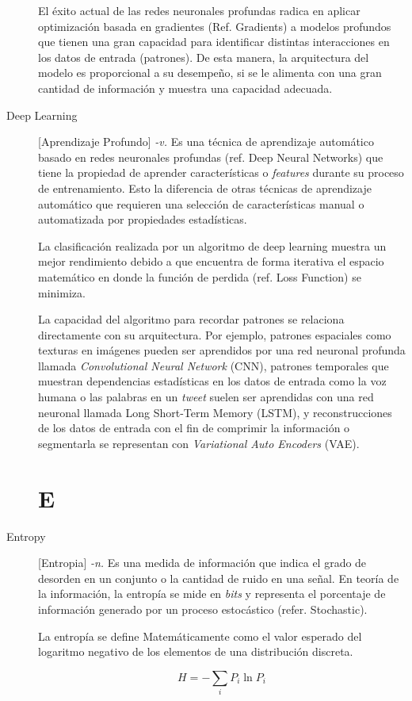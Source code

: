 \documentclass[twoside]{book}
\newcommand{\ditem}[1]{\item[#1] \markboth{\footnotesize \textbf{#1}}{\footnotesize \textbf{#1}}}
\begin{document}
\begin{multicols}{2}
\begin{description}
El éxito actual de las redes neuronales profundas radica en aplicar optimización basada en gradientes (Ref. Gradients) a modelos profundos que tienen una gran capacidad para identificar distintas interacciones en los datos de entrada (patrones). De esta manera, la arquitectura del modelo es proporcional a su desempeño, si se le alimenta con una gran cantidad de información y muestra una capacidad adecuada.
\ditem{Deep Learning} [Aprendizaje Profundo] \textit{-v.} Es una técnica de aprendizaje automático basado en redes neuronales profundas (ref. Deep Neural Networks) que tiene la propiedad de aprender características o \textit{features} durante su proceso de entrenamiento. Esto la diferencia de otras técnicas de aprendizaje automático que requieren una selección de características manual o automatizada por propiedades estadísticas. 

La clasificación realizada por un algoritmo de deep learning muestra un mejor rendimiento debido a que encuentra de forma iterativa el espacio matemático en donde la función de perdida (ref. Loss Function) se minimiza. 

La capacidad del algoritmo para recordar patrones se relaciona directamente con su arquitectura. Por ejemplo, patrones espaciales como texturas en imágenes pueden ser aprendidos por una red neuronal profunda llamada \textit{Convolutional Neural Network} (CNN), patrones temporales que muestran dependencias estadísticas en los datos de entrada como la voz  humana o las palabras en un \textit{tweet} suelen ser aprendidas con una red neuronal llamada Long Short-Term Memory (LSTM), y reconstrucciones de los datos de entrada con el fin de comprimir la información o segmentarla se representan con \textit{Variational Auto Encoders} (VAE).  
\section{E}
\ditem{Entropy} [Entropia] \textit{-n.}  Es una medida de información que indica el grado de desorden en un conjunto o la cantidad de ruido en una señal. En teoría de la información, la entropía se mide en \textit{bits} y representa el porcentaje de información generado por un proceso estocástico (refer. Stochastic). 

La entropía se define Matemáticamente como el valor esperado del logaritmo negativo de los elementos de una distribución discreta. 

$$H=-\sum _{i}P_{i}\ln {P_{i}}$$


\end{description}
\end{multicols}
\end{document}
